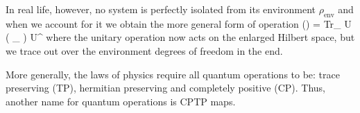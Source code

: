 \documentclass[aps,11pt,twoside,letterpaper]{article}
\def\Tr{\textup{Tr}}
\def\E{\mathcal{E}}
\begin{document}
			In real life, however, no system is perfectly isolated from its environment $\rho_{\text{env}}$ 
			and when we account for it we obtain the more general form of operation 
			\be
				\E(\rho) = \Tr_{} U \left( \rho \otimes \rho_{} \right) U^{\dag}
			\ee
			where the unitary operation now acts on the enlarged Hilbert space, but we trace out over the
			environment degrees of freedom in the end. 

			More generally, the laws of physics require all quantum operations to be:
			trace preserving (TP), hermitian preserving and completely positive (CP).
			Thus, another name for quantum operations is CPTP maps.
									
\end{document}
